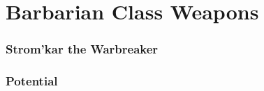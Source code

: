 \section{Barbarian Class Weapons}

\subsubsection{Strom'kar the Warbreaker}

\subsubsection{Potential}